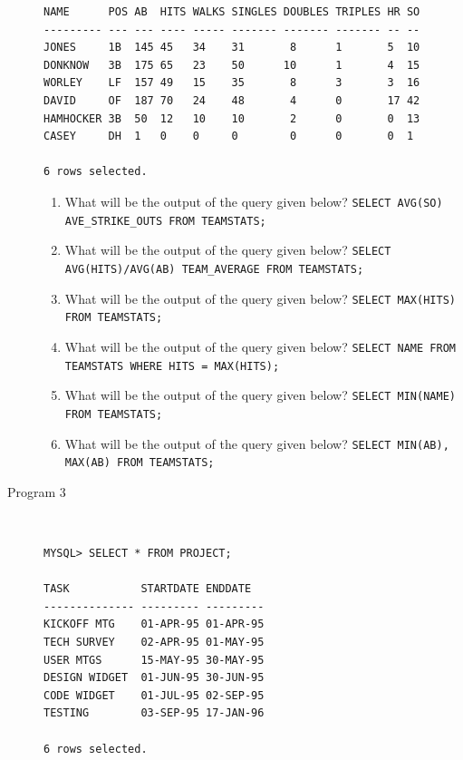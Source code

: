 \documentclass[11pt,a4paper]{article}
\def\AnswerBox{\fbox{\begin{minipage}{4in}\hfill\vspace{0.5in}\end{minipage}}}
\begin{document}
\begin{description}
\begin{verbatim}
NAME      POS AB  HITS WALKS SINGLES DOUBLES TRIPLES HR SO
--------- --- --- ---- ----- ------- ------- ------- -- --
JONES     1B  145 45   34    31       8      1       5  10
DONKNOW   3B  175 65   23    50      10      1       4  15
WORLEY    LF  157 49   15    35       8      3       3  16
DAVID     OF  187 70   24    48       4      0       17 42
HAMHOCKER 3B  50  12   10    10       2      0       0  13
CASEY     DH  1   0    0     0        0      0       0  1

6 rows selected.

\end{verbatim}


\begin{enumerate}[label=\bfseries Q\arabic*:]\itemsep10pt
\item What will be the output of the query given below?\newline
\texttt{SELECT AVG(SO) AVE\_STRIKE\_OUTS FROM TEAMSTATS;}
\item What will be the output of the query given below?\newline
\texttt{SELECT AVG(HITS)/AVG(AB) TEAM\_AVERAGE FROM TEAMSTATS;}
\item What will be the output of the query given below?\newline
\texttt{SELECT MAX(HITS) FROM TEAMSTATS;}
\item What will be the output of the query given below?\newline
\texttt{SELECT NAME FROM TEAMSTATS WHERE HITS = MAX(HITS);}
\item What will be the output of the query given below?\newline
\texttt{SELECT MIN(NAME) FROM TEAMSTATS;}
\item What will be the output of the query given below?\newline
\texttt{SELECT MIN(AB), MAX(AB) FROM TEAMSTATS;}
\end{enumerate}
\item [Program 3]\ 
\begin{verbatim}
MYSQL> SELECT * FROM PROJECT;

TASK           STARTDATE ENDDATE
-------------- --------- ---------
KICKOFF MTG    01-APR-95 01-APR-95
TECH SURVEY    02-APR-95 01-MAY-95
USER MTGS      15-MAY-95 30-MAY-95
DESIGN WIDGET  01-JUN-95 30-JUN-95
CODE WIDGET    01-JUL-95 02-SEP-95
TESTING        03-SEP-95 17-JAN-96

6 rows selected.
\end{verbatim}


\end{description}
\end{document}
